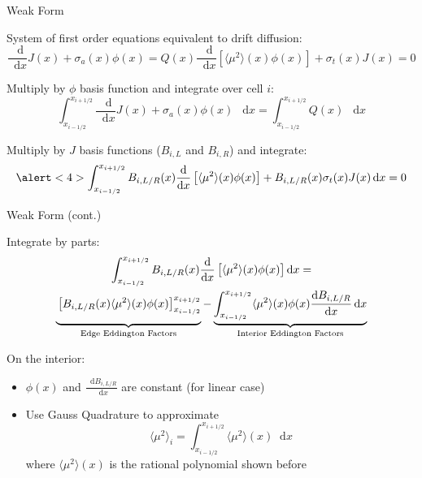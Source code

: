 \documentclass[10pt]{beamer}
\newcommand{\ud}{\mathop{}\!\mathrm{d}} %
\newcommand{\dderiv}[2]{\frac{\ud #1}{\ud #2}}
\newcommand{\edd}{\langle \mu^2 \rangle}
\newcommand{\bracket}[1]{\left[ #1 \right]}
\begin{document}
\begin{frame}{Weak Form}

	System of first order equations equivalent to drift diffusion:
	\begin{subequations} 
	\begin{equation*} \label{eq:zero}
		\dderiv{}{x} J (x) + \sigma_a(x) \phi(x) = Q(x)
	\end{equation*} 
	\begin{equation*} \label{eq:first}
		\dderiv{}{x} \bracket{\edd(x) \phi (x)} + \sigma_t(x) J(x) = 0
	\end{equation*}
	\end{subequations}

	\pause
	Multiply by $\phi$ basis function and integrate over cell $i$: 
	\begin{equation*}
		\int_{x_{i-1/2}}^{x_{i+1/2}} \dderiv{}{x} J (x) + \sigma_a(x) \phi(x) \ \ud x 
		= \int_{x_{i-1/2}}^{x_{i+1/2}} Q(x) \ \ud x
	\end{equation*}

	\pause
	Multiply by $J$ basis functions ($B_{i,L}$ and $B_{i,R}$) and integrate: 
	\begin{equation*}
		\alert<4>{\int_{x_{i-1/2}}^{x_{i+1/2}} 
			B_{i,L/R}(x)\dderiv{}{x} \bracket{\edd(x) \phi (x)}} + B_{i,L/R}(x)\sigma_t(x) J(x) \ud x = 0
	\end{equation*}

\end{frame}

\begin{frame}{Weak Form (cont.)}

	Integrate by parts:
	\begin{multline*}
		\int_{x_{i-1/2}}^{x_{i+1/2}} 
			B_{i,L/R}(x)\dderiv{}{x} \bracket{\edd(x) \phi (x)} \ud x = \\ 
		\underbrace{\vphantom{\int_{x_{i-1/2}}}
		\bracket{B_{i,L/R}(x)\edd(x)\phi(x)}_{x_{i-1/2}}^{x_{i+1/2}}}_\text{Edge Eddington Factors}
		- 
		\underbrace{\int_{x_{i-1/2}}^{x_{i+1/2}}
		\edd(x) \phi(x) \dderiv{B_{i,L/R}}{x} \ud x}_\text{Interior Eddington Factors}
	\end{multline*}

	\pause
	On the interior: 
	\begin{itemize}

		\item $\phi(x)$ and $\dderiv{B_{i,L/R}}{x}$ are constant (for linear case)

		\item Use Gauss Quadrature to approximate 
		\begin{equation*}
			\edd_i = \int_{x_{i-1/2}}^{x_{i+1/2}} \edd(x) \ud x 
		\end{equation*}
		where $\edd(x)$ is the rational polynomial shown before 

	\end{itemize}

\end{frame}
\end{document}
